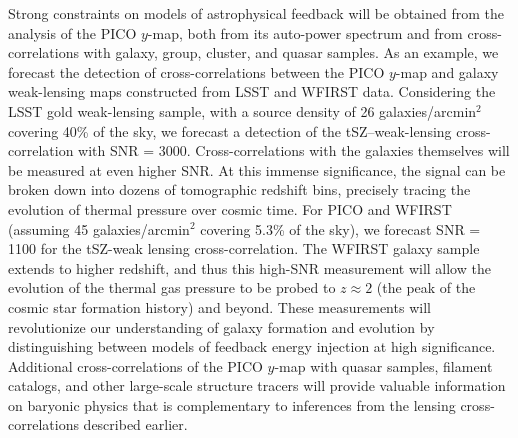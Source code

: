 \documentclass[PICOReport.tex]{subfiles}
\begin{document}
Strong constraints on models of astrophysical feedback will be obtained from the analysis of the PICO $y$-map, both from its auto-power spectrum and from cross-correlations with galaxy, group, cluster, and quasar samples. 
As an example, we forecast the detection of cross-correlations between the PICO $y$-map and galaxy weak-lensing maps constructed from LSST and WFIRST data.  Considering the LSST gold weak-lensing sample, with a source density of 26 galaxies/arcmin${}^2$ covering 40\% of the sky, we forecast a detection of the tSZ--weak-lensing cross-correlation with \ac{SNR} = 3000.  Cross-correlations with the galaxies themselves will be measured at even higher \ac{SNR}.  At this immense significance, the signal can be broken down into dozens of tomographic redshift bins, precisely tracing the evolution of thermal pressure over cosmic time.  For PICO and WFIRST (assuming 45 galaxies/arcmin${}^2$ covering 5.3\% of the sky), we forecast \ac{SNR} = 1100 for the tSZ-weak lensing cross-correlation.  The WFIRST galaxy sample extends to higher redshift, and thus this high-\ac{SNR} measurement will allow the evolution of the thermal gas pressure to be probed to $z \approx 2$ (the peak of the cosmic star formation history) and beyond.  These measurements will revolutionize our understanding of galaxy formation and evolution by distinguishing between models of feedback energy injection at high significance.  Additional cross-correlations of the PICO $y$-map with quasar samples, filament catalogs, and other large-scale structure tracers will provide valuable information on baryonic physics that is complementary to inferences from the lensing cross-correlations described earlier.  
\end{document}
